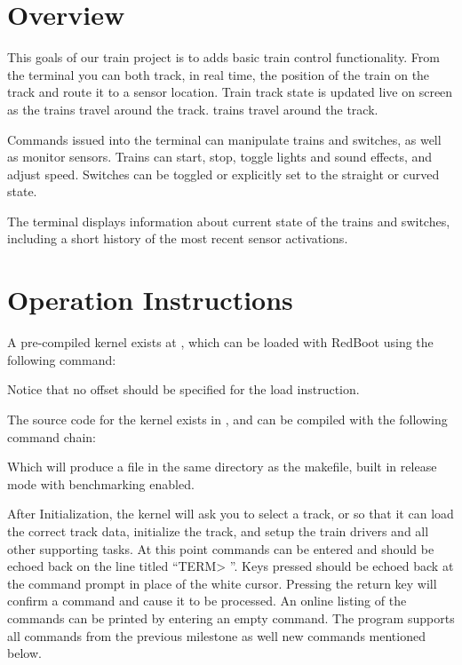 \documentclass[pdftex,10pt,a4paper]{article}
\begin{document}
\finalprojectmake

\section*{Overview}

This goals of our train project is to  adds basic train control functionality.
From the terminal you can both track, in real time, the position of
the train on the track and route it to a sensor location. Train track
state is updated live on screen as the trains travel around the track.
trains travel around the track.

Commands issued into the terminal can manipulate trains and
switches, as well as monitor sensors. Trains can start, stop, toggle
lights and sound effects, and adjust speed. Switches can be toggled or
explicitly set to the straight or curved state.

The terminal displays information about current state
of the trains and switches, including a short history of the most
recent sensor activations.


\section*{Operation Instructions}

A pre-compiled kernel exists at
, which can be loaded with
RedBoot using the following command:

\begin{center}
\end{center}

Notice that no offset should be specified for the load instruction.

The source code for the kernel exists in ,
and can be compiled with the following command chain:

\begin{center}
\end{center}

Which will produce a  file in the same directory as
the makefile, built in release mode with benchmarking enabled.

After Initialization, the kernel will ask you to select a track,
 or  so that it can load the correct track data,
initialize the track, and setup the train drivers and all other
supporting tasks.  At this point commands can be entered and should be
echoed back on the line titled ``TERM> ''. Keys pressed should be
echoed back at the command prompt in place of the white
cursor. Pressing the return key will confirm a command and cause it to
be processed. An online listing of the commands can be printed by
entering an empty command. The program supports all commands from the
previous milestone as well new commands mentioned below.
\end{document}
